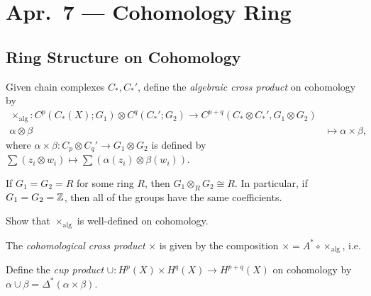 \chapter{Apr.~7 --- Cohomology Ring}

\section{Ring Structure on Cohomology}

\begin{definition}
  Given chain complexes $C_*, C_*'$, define
  the \emph{algebraic cross product} on
  cohomology by
  \begin{align*}
    \times_{\mathrm{alg}} : C^p(C_*(X); G_1)
    \otimes C^q(C_*'; G_2)
    \longrightarrow C^{p + q}(C_* \otimes C_*', G_1 \otimes G_2) \\
    \alpha \otimes \beta
    &\longmapsto
    \alpha \times \beta,
  \end{align*}
  where $\alpha \times \beta : C_p \otimes C_q' \to G_1 \otimes G_2$ is defined by
  $\sum (z_i \otimes w_i) \mapsto \sum (\alpha(z_i) \otimes \beta(w_i))$.
\end{definition}

\begin{remark}
  If $G_1 = G_2 = R$ for some ring $R$, then
  $G_1 \otimes_R G_2 \cong R$. In particular,
  if $G_1 = G_2 = \mathbb{Z}$, then all of the groups
  have the same coefficients.
\end{remark}

\begin{exercise}
  Show that $\times_{\mathrm{alg}}$ is
  well-defined on cohomology.
\end{exercise}

\begin{definition}
  The \emph{cohomological cross product}
  $\times$ is given by the composition
  $\times = A^* \circ \times_{\mathrm{alg}}$,
  i.e.
  \begin{center}
  \end{center}
  Define the \emph{cup product}
  $\cup : H^p(X) \times H^q(X) \to H^{p+q}(X)$
  on cohomology by
  $\alpha \cup \beta = \Delta^*(\alpha \times \beta)$.
\end{definition}

